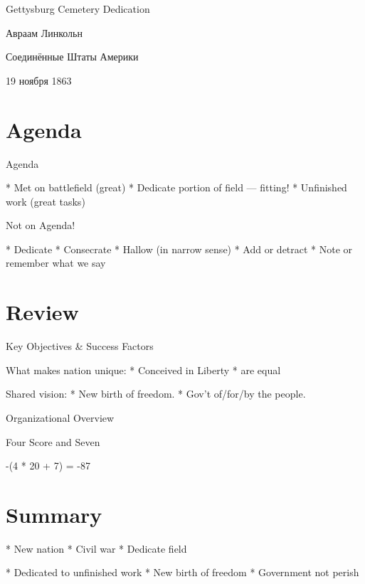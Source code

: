 \documentclass{beamer}
\begin{document}
Gettysburg Cemetery Dedication

Авраам Линкольн

Соединённые Штаты Америки

19 ноября 1863

\section{Agenda}

Agenda

  * Met on battlefield (great)
  * Dedicate portion of field --- fitting!
  * Unfinished work (great tasks)

Not on Agenda!

  * Dedicate
  * Consecrate
  * Hallow (in narrow sense)
  * Add or detract
  * Note or remember what we say

\section{Review}

Key Objectives \& Success Factors

What makes nation unique:
  * Conceived in Liberty
  * are equal

Shared vision:
  * New birth of freedom.
  * Gov't of/for/by the people.

Organizational Overview


Four Score and Seven

-(4 * 20 + 7) = -87

\section{Summary}

* New nation
* Civil war
* Dedicate field

* Dedicated to unfinished work
* New birth of freedom
* Government not perish
\end{document}
